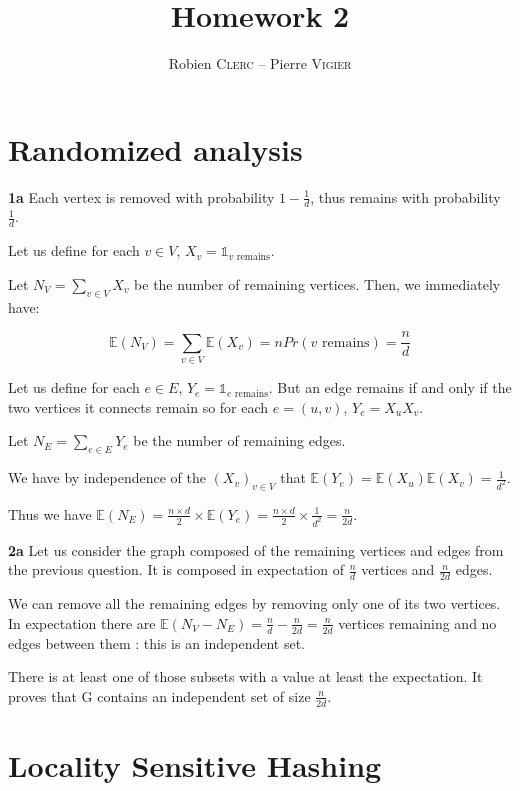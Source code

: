 \documentclass[10pt,a4paper]{article}
\title{Homework 2}
\author{Robien \textsc{Clerc} -- Pierre \textsc{Vigier}}
\theoremstyle{plain}
\begin{document}
\maketitle

\section{Randomized analysis}

\textbf{1a} Each vertex is removed with probability $1 - \frac{1}{d}$, thus remains with probability $\frac{1}{d}$.

Let us define for each $v \in V$, $X_v = \mathds{1}_{v\text{ remains}}$.

Let $N_V = \sum_{v \in V}{X_v}$ be the number of remaining vertices. Then, we immediately have:

$$
\mathbb{E}(N_V) = \sum_{v \in V}{\mathbb{E}(X_v)} = n Pr(v \text{ remains}) = \frac{n}{d}
$$

Let us define for each $e \in E$, $Y_e = \mathds{1}_{e\text{ remains}}$. But an edge remains if and only if the two vertices it connects remain so for each $e = (u, v)$, $Y_e = X_uX_v$.

Let $N_E = \sum_{e \in E}{Y_e}$ be the number of remaining edges. 

We have by independence of the $(X_v)_{v \in V}$ that $\mathbb{E}(Y_e) = \mathbb{E}(X_u) \mathbb{E}(X_v) = \frac{1}{d^2}$.

Thus we have $\mathbb{E}(N_E) = \frac{n \times d}{2} \times \mathbb{E}(Y_e) =\frac{n \times d}{2} \times \frac{1}{d^2} = \frac{n}{2d}$.

\textbf{2a} Let us consider the graph composed of the remaining vertices and edges from the previous question. It is composed in expectation of $\frac{n}{d}$ vertices and $\frac{n}{2d}$ edges.

We can remove all the remaining edges by removing only one of its two vertices. In expectation there are $\mathbb{E}(N_V - N_E) = \frac{n}{d} - \frac{n}{2d} = \frac{n}{2d}$ vertices remaining and no edges between them : this is an independent set.

There is at least one of those subsets with a value at least the expectation. It proves that G contains an independent set of size $\frac{n}{2d}$.

\section{Locality Sensitive Hashing}
\end{document}

